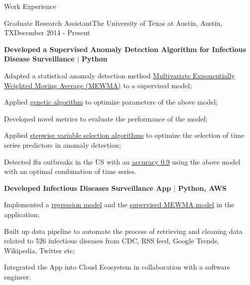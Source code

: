 \documentclass{my_resume} %
\begin{document}
\begin{rSection}{Work Experience}
  \begin{rSubsection}{Graduate Research Assistant}{The University of Texas at
    Austin, Austin, TX}{December 2014 - Present}
  \item[] \textbf{Developed a Supervised Anomaly Detection Algorithm for Infectious
    Disease Surveillance $|$ Python}
    \item Adapted a statistical anomaly detection method \underline{Multivariate
      Exponentially Weighted Moving Average (MEWMA)} to a supervised model;
    \item Applied \underline{genetic algorithm} to optimize parameters of the
      above model;
    \item Developed novel metrics to evaluate the performance of the model;
    \item Applied \underline{stepwise variable selection algorithms} to
      optimize the selection of time series predictors in anomaly detection;
    \item Detected flu outbreaks in the US with an \underline{accuracy
      0.9} using the above model with an optimal combination of time series.
\vspace{1mm}
  \item[] \textbf{Developed Infectious Diseases Surveillance App $|$ Python, AWS}
    \item Implemented a \underline{regression model} and the
      \underline{supervised MEWMA model} in the application;
    \item Built up data pipeline to automate the process of retrieving and
      cleaning data related to 526 infectious diseases from CDC, RSS feed, Google
      Trends, Wikipedia, Twitter etc;
    \item Integrated the App into Cloud Ecosystem in collaboration with a
      software engineer.


  \end{rSubsection}
\end{rSection}
\end{document}
